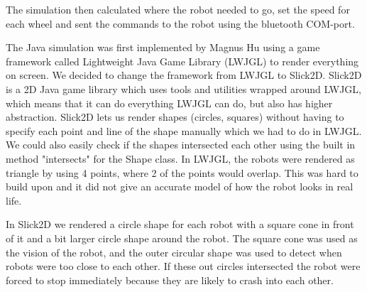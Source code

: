The simulation then calculated where the robot needed to go, set the speed for each wheel and sent the commands to the robot using the bluetooth COM-port.

The Java simulation was first implemented by Magnus Hu using a game framework called Lightweight Java Game Library (LWJGL) to render everything on screen. We decided to change the framework from LWJGL to Slick2D. Slick2D is a 2D Java game library which uses tools and utilities wrapped around LWJGL, which means that it can do everything LWJGL can do, but also has higher abstraction. Slick2D lets us render shapes (circles, squares) without having to specify each point and line of the shape manually which we had to do in LWJGL. We could also easily check if the shapes intersected each other using the built in method "intersects" for the Shape class. In LWJGL, the robots were rendered as triangle by using 4 points, where 2 of the points would overlap. This was hard to build upon and it did not give an accurate model of how the robot looks in real life.
 
In Slick2D we rendered a circle shape for each robot with a square cone in front of it and a bit larger circle shape around the robot. The square cone was used as the vision of the robot, and the outer circular shape was used to detect when robots were too close to each other. If these out circles intersected the robot were forced to stop immediately because they are likely to crash into each other.

